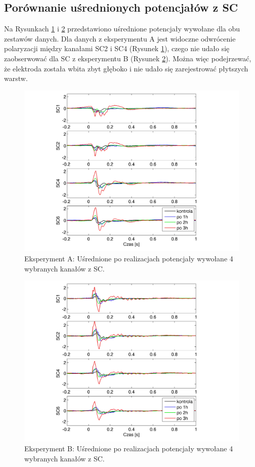 \documentclass{pracamgr}
\begin{document}
	\subsection{Porównanie uśrednionych potencjałów z SC}\label{SC}
	Na Rysunkach \ref{rys:kontrola15_SC} i \ref{rys:beta3_SC} przedstawiono uśrednione potencjały wywołane dla obu zestawów danych. Dla danych z eksperymentu A jest widoczne odwrócenie polaryzacji między kanałami SC2 i SC4 (Rysunek \ref{rys:kontrola15_SC}), czego nie udało się zaobserwować dla SC z eksperymentu B (Rysunek \ref{rys:beta3_SC}). Można więc podejrzewać, że elektroda została wbita zbyt głęboko i nie udało się zarejestrować płytszych warstw.
	\begin{figure}[htbp]
		\begin{center}
			\includegraphics[scale=0.8]{kontrola15_SC.png}
		\end{center}
		\caption{Eksperyment A: Uśrednione po realizacjach potencjały wywołane 4 wybranych kanałów z SC.}
		\label{rys:kontrola15_SC}
	\end{figure}
	\begin{figure}[htbp]
		\begin{center}
			\includegraphics[scale=0.8]{beta3_SC.png}
		\end{center}
		\caption{Eksperyment B: Uśrednione po realizacjach potencjały wywołane 4 wybranych kanałów z SC.}
		\label{rys:beta3_SC}
	\end{figure}
\end{document}

